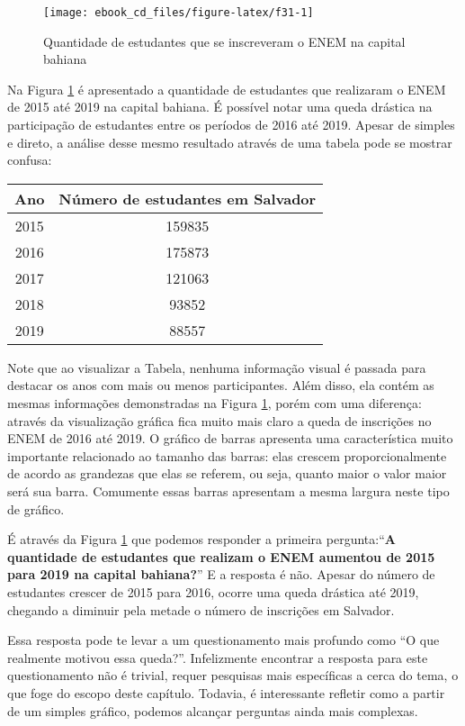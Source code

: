 \documentclass[
  oneside]{book}
\begin{document}
\begin{figure}

{\centering \texttt{[image: ebook\_cd\_files/figure-latex/f31-1]} 

}

\caption{Quantidade de estudantes que se inscreveram o ENEM na capital bahiana}\label{fig:f31}
\end{figure}

Na Figura \ref{fig:f31} é apresentado a quantidade de estudantes que realizaram o ENEM de 2015 até 2019 na capital bahiana. É possível notar uma queda drástica na participação de estudantes entre os períodos de 2016 até 2019. Apesar de simples e direto, a análise desse mesmo resultado através de uma tabela pode se mostrar confusa:

\begin{longtable}[]{@{}cc@{}}
\toprule
Ano & Número de estudantes em Salvador\tabularnewline
\midrule
\endhead
2015 & 159835\tabularnewline
2016 & 175873\tabularnewline
2017 & 121063\tabularnewline
2018 & 93852\tabularnewline
2019 & 88557\tabularnewline
\bottomrule
\end{longtable}

Note que ao visualizar a Tabela, nenhuma informação visual é passada para destacar os anos com mais ou menos participantes. Além disso, ela contém as mesmas informações demonstradas na Figura \ref{fig:f31}, porém com uma diferença: através da visualização gráfica fica muito mais claro a queda de inscrições no ENEM de 2016 até 2019. O gráfico de barras apresenta uma característica muito importante relacionado ao tamanho das barras: elas crescem proporcionalmente de acordo as grandezas que elas se referem, ou seja, quanto maior o valor maior será sua barra. Comumente essas barras apresentam a mesma largura neste tipo de gráfico.

É através da Figura \ref{fig:f31} que podemos responder a primeira pergunta:``\textbf{A quantidade de estudantes que realizam o ENEM aumentou de 2015 para 2019 na capital bahiana?}'' E a resposta é não. Apesar do número de estudantes crescer de 2015 para 2016, ocorre uma queda drástica até 2019, chegando a diminuir pela metade o número de inscrições em Salvador.

Essa resposta pode te levar a um questionamento mais profundo como ``O que realmente motivou essa queda?''. Infelizmente encontrar a resposta para este questionamento não é trivial, requer pesquisas mais específicas a cerca do tema, o que foge do escopo deste capítulo. Todavia, é interessante refletir como a partir de um simples gráfico, podemos alcançar perguntas ainda mais complexas.
\end{document}
